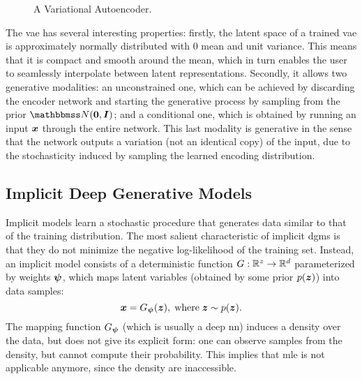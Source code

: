 \begin{figure*}[h!]
    \centering
    \resizebox{.75\textwidth}{!}{}
    \caption{A Variational Autoencoder.}
    \label{fig:vae}
\end{figure*}
The \gls{vae} has several interesting properties: firstly, the latent space of a trained \gls{vae} is approximately normally distributed with 0 mean and unit variance. This means that it is compact and smooth around the mean, which in turn enables the user to seamlessly interpolate between latent representations. Secondly, it allows two generative modalities: an unconstrained one, which can be achieved by discarding the encoder network and starting the generative process by sampling from the prior $\Normal{\Zeros}{\Identity}$; and a conditional one, which is obtained by running an input $\Vector{x}$ through the entire network. This last modality is generative in the sense that the network outputs a variation (not an identical copy) of the input, due to the stochasticity induced by sampling the learned encoding distribution.

\subsection{Implicit Deep Generative Models}
Implicit models \citep{mohamed2016implicitgan} learn a stochastic procedure that generates data similar to that of the training distribution. The most salient characteristic of implicit \glspl{dgm} is that they do not minimize the negative log-likelihood of the training set. Instead, an implicit model consists of a deterministic  function $G: \mathbb{R}^z \rightarrow \mathbb{R}^d$ parameterized by weights $\boldsymbol{\psi}$, which maps latent variables (obtained by some prior $p(\Vector{z})$) into data samples:
$$\Vector{x} = \Generator(\Vector{z}),\; \mathrm{where}\; \Vector{z} \sim p(\Vector{z}).$$
The mapping function $G_{\boldsymbol{\psi}}$ (which is usually a deep \gls{nn}) induces a density over the data, but does not give its explicit form: one can observe samples from the density, but cannot compute their probability. This implies that \gls{mle} is not applicable anymore, since the density are inaccessible.

